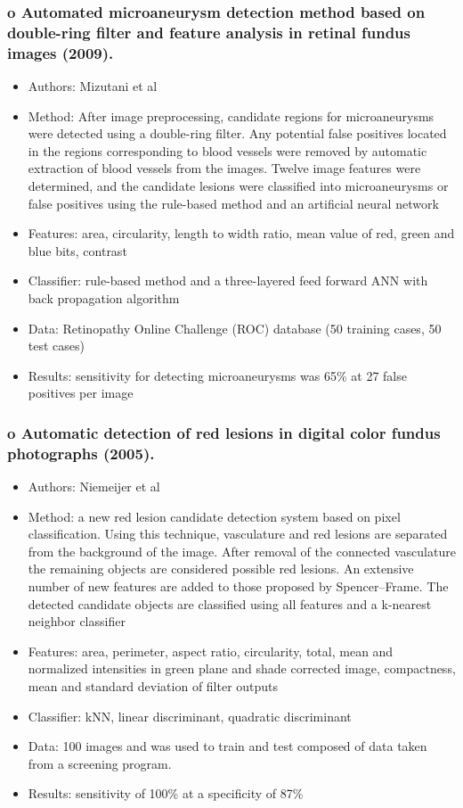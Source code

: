 \documentclass[12pt]{report}
\begin{document}
\subsubsection{o   Automated microaneurysm detection method based on double-ring filter and feature analysis in retinal fundus images (2009). \cite{mizutani2009automated}}
\begin{itemize}
\item Authors: Mizutani et al
\item Method: After image preprocessing, candidate regions for microaneurysms were detected using a double-ring filter. Any potential false positives located in the regions corresponding to blood vessels were removed by automatic extraction of blood vessels from the images. Twelve image features were determined, and the candidate lesions were classified into microaneurysms or false positives using the rule-based method and an artificial neural network
\item Features: area, circularity, length to width ratio, mean value of red, green and blue bits, contrast
\item Classifier: rule-based method and a three-layered feed forward ANN with back propagation algorithm
\item Data: Retinopathy Online Challenge (ROC) database (50 training cases, 50 test cases)
\item Results: sensitivity for detecting microaneurysms was 65\% at 27 false positives per image
\end{itemize}

\subsubsection{o   Automatic detection of red lesions in digital color fundus photographs (2005). \cite{niemeijer2005automatic}}
\begin{itemize}
\item Authors: Niemeijer et al
\item Method: a new red lesion candidate detection system based on pixel classification. Using this technique, vasculature and red lesions are separated from the background of the image. After removal of the connected vasculature the remaining objects are considered possible red lesions. An extensive number of new features are added to those proposed by Spencer–Frame. The detected candidate objects are classified using all features and a k-nearest neighbor classifier
\item Features: area, perimeter, aspect ratio, circularity, total, mean and normalized intensities in green plane and shade corrected image, compactness, mean and standard deviation of filter outputs
\item Classifier: kNN, linear discriminant, quadratic discriminant
\item Data: 100 images and was used to train and test composed of data taken from a screening program.
\item Results: sensitivity of 100\% at a specificity of 87\%
\end{itemize}
\end{document}
